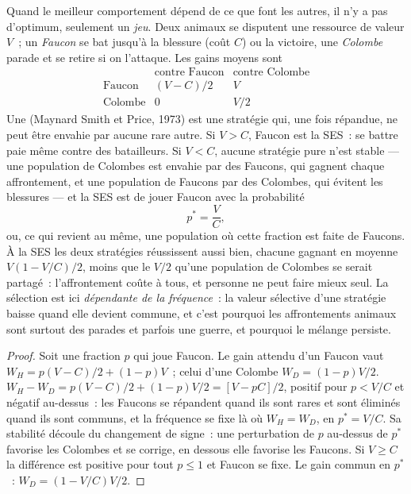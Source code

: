 \begin{proposition}\label{prop:b3:behavioural-ecology:hawk-dove}
Quand le meilleur comportement dépend de ce que font les autres, il n'y
a pas d'optimum, seulement un \emph{jeu}. Deux animaux se disputent une
ressource de valeur $V$~; un \emph{Faucon} se bat jusqu'à la blessure
(coût $C$) ou la victoire, une \emph{Colombe} parade et se retire si on
l'attaque. Les gains moyens sont
\[
\begin{array}{c|cc}
 & \text{contre Faucon} & \text{contre Colombe}\\ \hline
\text{Faucon} & (V - C)/2 & V\\
\text{Colombe} & 0 & V/2
\end{array}
\]
Une \emph{} (Maynard Smith et Price, 1973)
est une stratégie qui, une fois répandue, ne peut être envahie par
aucune rare autre. Si $V > C$, Faucon est la SES~: se battre paie même
contre des batailleurs. Si $V
< C$, aucune stratégie pure n'est stable --- une population de Colombes
est envahie par des Faucons, qui gagnent chaque affrontement, et une
population de Faucons par des Colombes, qui évitent les blessures --- et
la SES est de jouer Faucon avec la probabilité
\[
p^{*} = \frac{V}{C},
\]
ou, ce qui revient au même, une population où cette fraction est faite
de Faucons. À la SES les deux stratégies réussissent aussi bien, chacune
gagnant en moyenne $V(1 -
V/C)/2$, moins que le $V/2$ qu'une population de Colombes se serait
partagé~: l'affrontement coûte à tous, et personne ne peut faire mieux
seul. La sélection est ici \emph{dépendante de la fréquence}~: la valeur
sélective d'une stratégie baisse quand elle devient commune, et c'est
pourquoi les affrontements animaux sont surtout des parades et parfois
une guerre, et pourquoi le mélange persiste.
\end{proposition}
\begin{proof}
Soit une fraction $p$ qui joue Faucon. Le gain attendu d'un Faucon vaut
$W_{H} = p(V
- C)/2 + (1 - p)V$~; celui d'une Colombe $W_{D} = (1 - p)V/2$. $W_{H} - W_{D} =
p(V - C)/2 + (1 - p)V/2 = [V - pC]/2$, positif pour $p < V/C$ et négatif
au-dessus~: les Faucons se répandent quand ils sont rares et sont
éliminés quand ils sont communs, et la fréquence se fixe là où
$W_{H} = W_{D}$, en $p^{*} = V/C$. Sa stabilité découle du changement de
signe~: une perturbation de $p$ au-dessus de $p^{*}$ favorise les
Colombes et se corrige, en dessous elle favorise les Faucons. Si $V
\ge C$ la différence est positive pour tout $p \le 1$ et Faucon se fixe.
Le gain commun en $p^{*}$~: $W_{D} = (1 - V/C)V/2$.
\end{proof}

